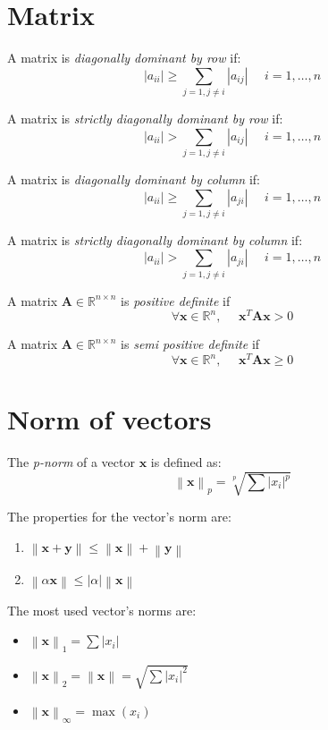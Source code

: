 \documentclass[12pt, a4paper]{report}
\newtheorem[style=M,bodystyle=\normalfont]{theorem}{Theorem}
\newtheorem[style=M,bodystyle=\normalfont]{proposition}{Proposition}
\newtheorem[style=M,bodystyle=\normalfont]{corollary}{Corollary}
\newtheorem[style=M,bodystyle=\normalfont]{lemma}{Lemma}
\newtheorem[style=M,bodystyle=\normalfont]{definition}{Definition}
\begin{document}
    \section{Matrix}
    \begin{definition}
        A matrix is \emph{diagonally dominant by row} if: 
        \[\left\lvert a_{ii} \right\rvert \geq \sum_{j=1,j \neq i}{\left\lvert a_{ij} \right\rvert} \:\:\:\:\:\: i=1,\dots,n\]

        A matrix is \emph{strictly diagonally dominant by row} if: 
        \[\left\lvert a_{ii} \right\rvert > \sum_{j=1,j \neq i}{\left\lvert a_{ij} \right\rvert} \:\:\:\:\:\: i=1,\dots,n\]

        A matrix is \emph{diagonally dominant by column} if: 
        \[\left\lvert a_{ii} \right\rvert \geq \sum_{j=1,j \neq i}{\left\lvert a_{ji} \right\rvert} \:\:\:\:\:\: i=1,\dots,n \]

        A matrix is \emph{strictly diagonally dominant by column} if: 
        \[\left\lvert a_{ii} \right\rvert > \sum_{j=1,j \neq i}{\left\lvert a_{ji} \right\rvert} \:\:\:\:\:\: i=1,\dots,n \]

        A matrix $\boldsymbol{A} \in \mathbb{R}^{n \times n}$ is \emph{positive definite} if 
        \[\forall\boldsymbol{x} \in \mathbb{R}^{n}, \:\:\:\:\:\: \boldsymbol{x}^T \boldsymbol{Ax}>0\]

        A matrix $\boldsymbol{A} \in \mathbb{R}^{n \times n}$ is \emph{semi positive definite} if 
        \[\forall\boldsymbol{x} \in \mathbb{R}^{n}, \:\:\:\:\:\: \boldsymbol{x}^T \boldsymbol{Ax} \geq 0\]
    \end{definition}

    \section{Norm of vectors}
    \begin{definition}
        The \emph{p-norm} of a vector $\boldsymbol{x}$ is defined as: 
        \[\left\lVert \boldsymbol{x} \right\rVert_p=\sqrt[p]{\sum{\left\lvert x_i \right\rvert^p }}\]
    \end{definition}
    The properties for the vector's norm are: 
    \begin{enumerate}
        \item $\left\lVert \boldsymbol{x}+\boldsymbol{y} \right\rVert \leq \left\lVert \boldsymbol{x} \right\rVert + \left\lVert \boldsymbol{y} \right\rVert$
        \item $\left\lVert \alpha \boldsymbol{x} \right\rVert \leq \left\lvert \alpha \right\rvert \left\lVert \boldsymbol{x} \right\rVert$
    \end{enumerate}
    The most used vector's norms are: 
    \begin{itemize}
        \item $\left\lVert \boldsymbol{x} \right\rVert_1=\sum{\left\lvert x_i \right\rvert}$
        \item $\left\lVert \boldsymbol{x} \right\rVert_2=\left\lVert \boldsymbol{x} \right\rVert=\sqrt{\sum{\left\lvert x_i \right\rvert^2}}$
        \item $\left\lVert \boldsymbol{x} \right\rVert_{\infty}=\max{\left(x_i\right)}$
    \end{itemize}
\end{document}
